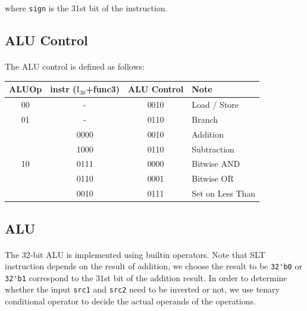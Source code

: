 \documentclass{article}
\begin{document}
\noindent
where \verb|sign| is the 31st bit of the instruction.

\newpage

\subsection{ALU Control}

\paragraph{}
The ALU control is defined as follows:

\begin{center}
    \begin{tabular}{c|c|c|l}
        ALUOp & instr ($\text{I}_{30}$+func3) & ALU Control & Note                                   \\
        \hline
        00    & -                             & 0010        & Load / Store                           \\
        \hline
        01    & -                             & 0110        & Branch                                 \\
        \hline
              & 0000                          & 0010        & Addition                               \\
              & 1000                          & 0110        & Subtraction                            \\
        10    & 0111                          & 0000        & Bitwise AND                            \\
              & 0110                          & 0001        & Bitwise OR                             \\
              & 0010                          & 0111        & Set on Less Than
    \end{tabular}
\end{center}

\subsection{ALU}

\paragraph{}
The 32-bit ALU is implemented using builtin operators.
Note that SLT instruction depends on the result of addition, 
we choose the result to be \verb|32'b0| or \verb|32'b1| correspond to the 31st bit of the addition result.
In order to determine whether the input \verb|src1| and \verb|src2| need to be inverted or not, 
we use tenary conditional operator to decide the actual operands of the operations. 
\end{document}
